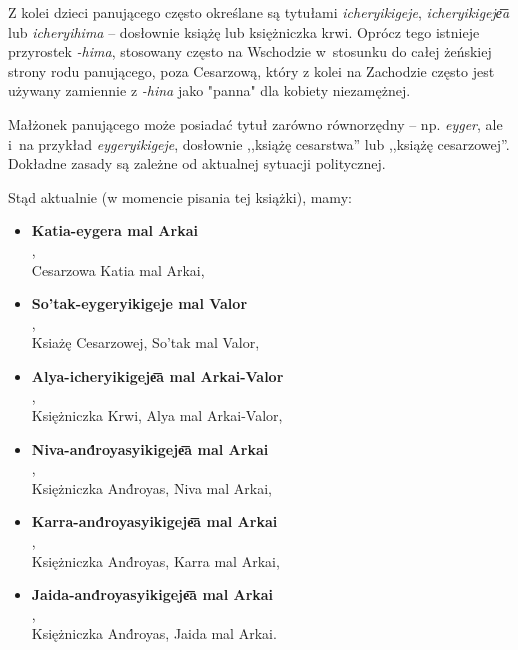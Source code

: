 Z kolei dzieci panującego często określane są tytułami \emph{icheryikigeje},
\emph{icheryikigeje͞a} lub \emph{icheryihima} -- dosłownie książę lub
księżniczka krwi. Oprócz tego istnieje przyrostek \emph{-hima}, stosowany często
na Wschodzie w~stosunku do całej żeńskiej strony rodu panującego, poza
Cesarzową, który z kolei na Zachodzie często jest używany zamiennie z
\emph{-hina} jako "panna" dla kobiety niezamężnej.

Małżonek panującego może posiadać tytuł zarówno równorzędny -- np. \emph{eyger},
ale i~na przykład \emph{eygeryikigeje}, dosłownie ,,książę cesarstwa'' lub
,,książę cesarzowej''. Dokładne zasady są zależne od aktualnej sytuacji
politycznej.

Stąd aktualnie (w momencie pisania tej książki), mamy:

\begin{itemize}
    \item \textbf{Katia-eygera mal Arkai}\\ ,\\
          Cesarzowa Katia mal Arkai,
    \item \textbf{So'tak-eygeryikigeje mal Valor}\\ ,\\ Ksiażę Cesarzowej, So'tak mal Valor,
    \item \textbf{Alya-icheryikigeje͞a mal Arkai-Valor}\\,\\ Księżniczka Krwi, Alya mal Arkai-Valor,
    \item \textbf{Niva-and́royasyikigeje͞a mal Arkai}\\,\\ Księżniczka And́royas, Niva mal Arkai,
    \item \textbf{Karra-and́royasyikigeje͞a mal Arkai}\\,\\ Księżniczka And́royas, Karra mal Arkai,
    \item \textbf{Jaida-and́royasyikigeje͞a mal Arkai}\\,\\ Księżniczka And́royas, Jaida mal Arkai.
\end{itemize}

